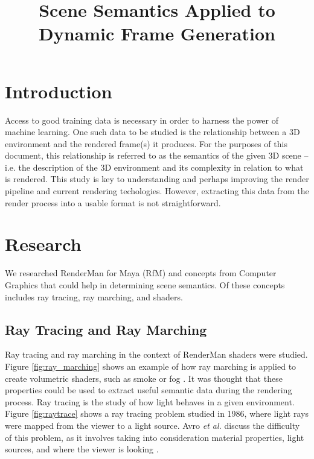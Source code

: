 \documentclass[conference]{IEEEtran}
\begin{document}
\title{Scene Semantics Applied to \\ Dynamic Frame Generation}

\author{
}

\maketitle

\begin{abstract}
\end{abstract}

\section{Introduction}
\label{sec:introduction}
Access to good training data is necessary
in order to harness the power of machine learning.
One such data to be studied is the relationship
between a 3D environment and the
rendered frame(s) it produces.
For the purposes of this document, this relationship is
referred to as the semantics of the given 3D scene --
i.e. the description of the 3D environment and its complexity
in relation to what is rendered.
This study is key to understanding and perhaps improving the
render pipeline and current rendering techologies.
However, extracting this data from the render process into a usable
format is not straightforward.

\section{Research}
We researched RenderMan for Maya (RfM) and concepts from Computer Graphics
that could help in determining scene semantics.
Of these concepts includes ray tracing, ray marching, and shaders.

\subsection{Ray Tracing and Ray Marching}
Ray tracing and ray marching in the context of RenderMan shaders were studied.
Figure \ref{fig:ray_marching} shows an example of how ray marching is applied to
create volumetric shaders, such as smoke or fog \cite{ray_marching}.
It was thought that these properties could be used to extract useful semantic data
during the rendering process.
Ray tracing is the study of how light behaves in a given environment.
Figure \ref{fig:raytrace}
shows a ray tracing problem studied in 1986, where light rays were mapped from
the viewer to a light source. Avro \textit{et al.}
discuss the difficulty of this problem,
as it involves taking into consideration material properties, light sources,
and where the viewer is looking \cite{backwards_raytrace}.
\end{document}
